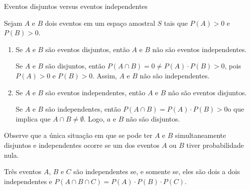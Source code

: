 \begin{example} {Eventos disjuntos versus eventos independentes}

Sejam \(A\) e \(B\) dois eventos em um espaço amostral \(S\) tais que \(P(A)>0\) e \(P(B)>0\).
\begin{enumerate}
\item {} 
Se \(A\) e \(B\) são eventos disjuntos, então \(A\) e \(B\) não são eventos independentes.

Se \(A\) e \(B\) são disjuntos, então \(P(A\cap B)=0\neq P(A)\cdot P(B)>0\), pois \(P(A)>0\) e \(P(B)>0\). Assim, \(A\) e \(B\) não são independentes.

\item {} 
Se \(A\) e \(B\) são eventos independentes, então $A$ e $B$ não são eventos disjuntos.

Se \(A\) e \(B\) são independentes, então \(P(A\cap B)=P(A)\cdot P(B)>0\)o que implica que \(A\cap B\neq \emptyset\). Logo, \(a\) e \(B\) não são disjuntos.

\end{enumerate}

Observe que a única situação em que se pode ter \(A\)  e \(B\)  simultaneamente disjuntos e independentes ocorre se um dos eventos \(A\) ou \(B\) tiver probabilidade nula.
\end{example}

\begin{observation}{}

Três eventos \(A\), \(B\)  e  \(C\) são independentes se, e somente se, eles são dois a dois independentes e \(P(A\cap B\cap C)=P(A)\cdot P(B)\cdot P(C)\).
\end{observation}

